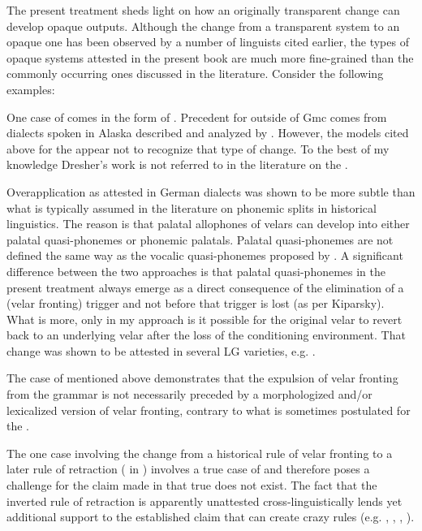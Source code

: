 The present treatment sheds light on how an originally transparent change can develop opaque outputs. Although the change from a transparent system to an opaque one has been observed by a number of linguists cited earlier, the types of opaque systems attested in the present book are much more fine-grained than the commonly occurring ones discussed in the literature. Consider the following examples:

One case of   comes in the form of . Precedent for  outside of Gmc comes from  dialects spoken in Alaska described and analyzed by \citet{Dresher2009}. However, the models cited above for the  appear not to recognize that type of change. To the best of my knowledge Dresher’s work is not referred to in the literature on the .

Overapplication as attested in German dialects was shown to be more subtle than what is typically assumed in the literature on phonemic splits in historical linguistics. The reason is that palatal allophones of velars can develop into either palatal quasi-phonemes or phonemic palatals. Palatal quasi-phonemes are not defined the same way as the vocalic quasi-phonemes proposed by \citet{Kiparsky2015}. A significant difference between the two approaches is that palatal quasi-phonemes in the present treatment always emerge as a direct consequence of the elimination of a (velar fronting) trigger and not before that trigger is lost (as per Kiparsky). What is more, only in my approach is it possible for the original velar to revert back to an underlying velar after the loss of the conditioning environment. That change was shown to be attested in several LG varieties, e.g. .

The case of  mentioned above demonstrates that the expulsion of velar fronting from the grammar is not necessarily preceded by a morphologized and/or lexicalized version of velar fronting, contrary to what is sometimes postulated for the  \citep{Hyman2013}.

The one case involving the change from a historical rule of velar fronting to a later rule of retraction ( in ) involves a true case of  and therefore poses a challenge for the claim made in \citet{McCarthy1991} that true  does not exist. The fact that the inverted rule of retraction is apparently unattested cross-linguistically lends yet additional support to the established claim that  can create crazy rules (e.g. \citealt{Vennemann1972}, \citealt{McCarthy1991}, \citealt{Blevins2004}, \citealt{Hall2009a}).

